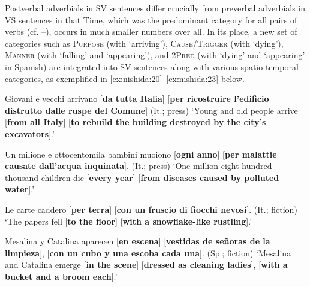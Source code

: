 \documentclass[output=paper,colorlinks,citecolor=brown,
]{langscibook}
\begin{document}
\newpage

Postverbal adverbials in SV sentences differ crucially from preverbal adverbials in VS sentences in that Time, which was the predominant category for all pairs of verbs (cf. --), occurs in much smaller numbers over all. In its place, a new set of categories such as \textsc{Purpose} (with `arriving'), \textsc{Cause/Trigger} (with `dying'), \textsc{Manner} (with `falling' and `appearing'), and \textsc{2Pred} (with `dying' and `appearing' in Spanish) are integrated into SV sentences along with various spatio-temporal categories, as exemplified in \ref{ex:nishida:20}--\ref{ex:nishida:23} below.

\begin{exe}
    \ex\label{ex:nishida:20}
    
   Giovani e vecchi arrivano [\textbf{da tutta Italia}] [\textbf{per ricostruire l'edificio distrutto dalle ruspe del Comune}] (It.; press)
    \glt `Young and old people arrive [\textbf{from all Italy}] [\textbf{to rebuild the building destroyed by the 		city's excavators}].'   
\end{exe}

\begin{exe}
    \ex\label{ex:nishida:21}
    
   Un milione e ottocentomila bambini muoiono [\textbf{ogni anno}] [\textbf{per malattie causate 					dall'acqua inquinata}]. (It.; press)
    \glt `One million eight hundred thousand children die [\textbf{every year}] [\textbf{from diseases caused by 		polluted water}].'  
\end{exe}

\begin{exe}
    \ex\label{ex:nishida:22}
    
   Le carte caddero [\textbf{per terra}] [\textbf{con un fruscio di fiocchi nevosi}]. (It.; fiction)
    \glt `The papers fell [\textbf{to the floor}] [\textbf{with a snowflake-like rustling}].'  
\end{exe}


\begin{exe}
    \ex\label{ex:nishida:23}
    
   Mesalina y Catalina aparecen [\textbf{en escena}] [\textbf{vestidas de señoras de la limpieza}], [\textbf{con un cubo y una escoba cada una}]. (Sp.; fiction)
    \glt `Mesalina and Catalina emerge [\textbf{in the scene}] [\textbf{dressed as cleaning ladies}], [\textbf{with a bucket and a broom each}].'
\end{exe}
\end{document}
